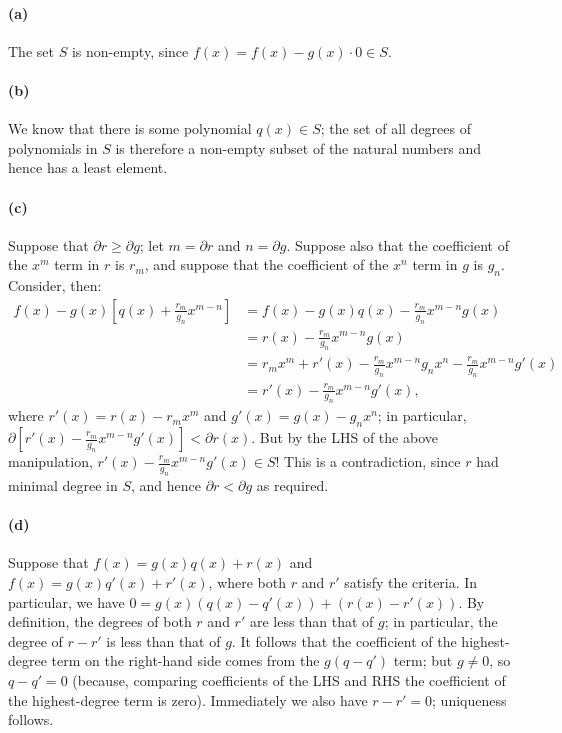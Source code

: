 \documentclass[a4paper,10pt]{article}
\begin{document}
\paragraph{(a)}
The set $ S $ is non-empty, since $ f(x) = f(x) - g(x) \cdot 0 \in S $.

\paragraph{(b)}
We know that there is some polynomial $ q(x) \in S $; the set of all degrees of polynomials in $ S $ is therefore a non-empty subset of the natural numbers
and hence has a least element.

\paragraph{(c)}
Suppose that $ \partial r \geq \partial g $; let $ m = \partial r $ and $ n = \partial g $. Suppose also that the coefficient of the $ x^m $ term in $ r $
is $ r_m $, and suppose that the coefficient of the $ x^n $ term in $ g $ is $ g_n $. Consider, then:
\begin{align*}
  f(x) - g(x) \left[ q(x) + \frac{r_m}{g_n} x^{m - n} \right] &= f(x) - g(x) q(x) - \frac{r_m}{g_n} x^{m - n} g(x)\\
                                                              &= r(x) - \frac{r_m}{g_n} x^{m - n} g(x) \\
                                                              &= r_m x^m + r'(x) - \frac{r_m}{g_n} x^{m - n} g_n x^n - \frac{r_m}{g_n} x^{m - n} g'(x)\\
                                                              &= r'(x) - \frac{r_m}{g_n} x^{m - n} g'(x),
\end{align*}
where $ r'(x) = r(x) - r_m x^m $ and $ g'(x) = g(x) - g_n x^n $; in particular, $ \partial[r'(x) - \frac{r_m}{g_n} x^{m - n} g'(x)] < \partial r(x) $. But
by the LHS of the above manipulation, $ r'(x) - \frac{r_m}{g_n} x^{m - n} g'(x) \in S $! This is a contradiction, since $ r $ had minimal degree in $ S $,
and hence $ \partial r < \partial g $ as required.

\paragraph{(d)}
Suppose that $ f(x) = g(x) q(x) + r(x) $ and $ f(x) = g(x) q'(x) + r'(x) $, where both $ r $ and $ r' $ satisfy the criteria. In particular, we
have $ 0 = g(x) (q(x) - q'(x)) + (r(x) - r'(x)) $. By definition, the degrees of both $ r $ and $ r' $ are less than that of $ g $; in particular,
the degree of $ r - r' $ is less than that of $ g $. It follows that the coefficient of the highest-degree term on the right-hand side comes
from the $ g(q - q') $ term; but $ g \neq 0 $, so $ q - q' = 0 $ (because, comparing coefficients of the LHS and RHS the coefficient of the
highest-degree term is zero). Immediately we also have $ r - r' = 0 $; uniqueness follows.
\end{document}
